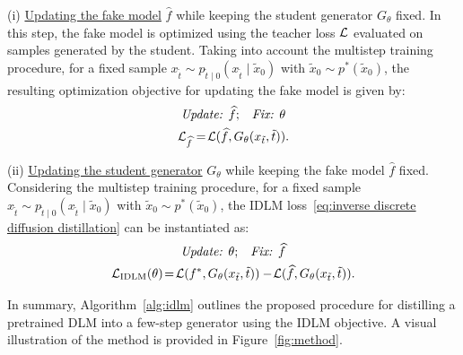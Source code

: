     (i) \underline{Updating the fake model} $\widehat{f}$ while keeping the student generator $G_{\theta}$ fixed. In this step, the fake model is optimized using the teacher loss $\mathcal{L}$ evaluated on samples generated by the student. Taking into account the multistep training procedure, for a fixed sample $x_{\tilde{t}} \sim p_{\tilde{t} \mid 0}(x_{\tilde{t}} \mid \tilde{x}_0)$ with $\tilde{x}_0 \sim p^*(\tilde{x}_0)$, the resulting optimization objective for updating the fake model is given by:
    \vspace{-1mm}
    \begin{gather}
    \label{eq:update fake in practice}
      \text{\textit{Update:} } \widehat{f} \text{;} \quad \text{\textit{Fix:} } \theta  \\
      \mathcal{L}_{\widehat{f}} = \! \mathcal{L}(\widehat{f}, G_{\theta}(x_{\tilde{t}}, \tilde{t})). \nonumber
    \end{gather}
   
    (ii) \underline{Updating the student generator} $G_{\theta}$ while keeping the fake model $\widehat{f}$ fixed. Considering the multistep training procedure, for a fixed sample $x_{\tilde{t}} \sim p_{\tilde{t} \mid 0}(x_{\tilde{t}} \mid \tilde{x}_0)$ with $\tilde{x}_0 \sim p^*(\tilde{x}_0)$, the IDLM loss~\eqref{eq:inverse discrete diffusion distillation} can be instantiated as:
    \vspace{-1mm}
    \begin{gather}
        \label{eq:update generator in practice}
        \text{\textit{Update:} } \theta \text{;} \quad \text{\textit{Fix:} } \widehat{f} \\
        \mathcal{L}_{\text{IDLM}}(\theta) \!=\! \mathcal{L}(f^*, G_{\theta}(x_{\tilde{t}}, \tilde{t}))-
      \! \mathcal{L}(\widehat{f}, G_{\theta}(x_{\tilde{t}}, \tilde{t})). \nonumber
    \end{gather}
    \vspace{-1mm}
    
\vspace{-3mm}
  In summary, Algorithm~\ref{alg:idlm} outlines the proposed procedure for distilling a pretrained DLM into a few-step generator using the IDLM objective. A visual illustration of the method is provided in Figure~\ref{fig:method}.
